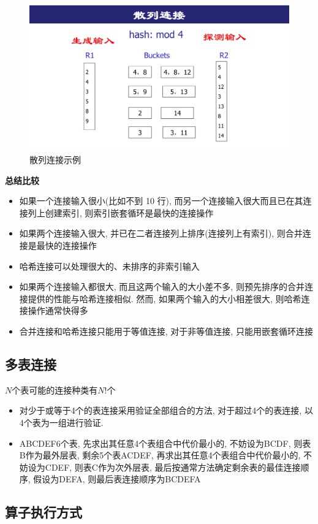 \begin{figure}[H]
    \centering
    \includegraphics[width=.5\textwidth]{figure/散列连接.pdf}
    \caption{散列连接示例}
\end{figure}

\textbf{总结比较}
\begin{itemize}
    \item 如果一个连接输入很小(比如不到 10 行), 而另一个连接输入很大而且已在其连接列上创建索引, 则索引嵌套循环是最快的连接操作
    \item 如果两个连接输入很大, 并已在二者连接列上排序(连接列上有索引), 则合并连接是最快的连接操作
    \item 哈希连接可以处理很大的、未排序的非索引输入
    \item 如果两个连接输入都很大, 而且这两个输入的大小差不多, 则预先排序的合并连接提供的性能与哈希连接相似. 然而, 如果两个输入的大小相差很大, 则哈希连接操作通常快得多
    \item 合并连接和哈希连接只能用于等值连接, 对于非等值连接, 只能用嵌套循环连接
\end{itemize}

\subsection{多表连接}

$N$个表可能的连接种类有$N!$个

\begin{itemize}
    \item 对少于或等于4个的表连接采用验证全部组合的方法, 对于超过4个的表连接, 以4个表为一组进行验证.
    \item ABCDEF6个表, 先求出其任意4个表组合中代价最小的, 不妨设为BCDF, 则表B作为最外层表, 剩余5个表ACDEF, 再求出其任意4个表组合中代价最小的, 不妨设为CDEF, 则表C作为次外层表, 最后按通常方法确定剩余表的最佳连接顺序, 假设为DEFA, 则最后表连接顺序为BCDEFA
\end{itemize}

\subsection{算子执行方式}

